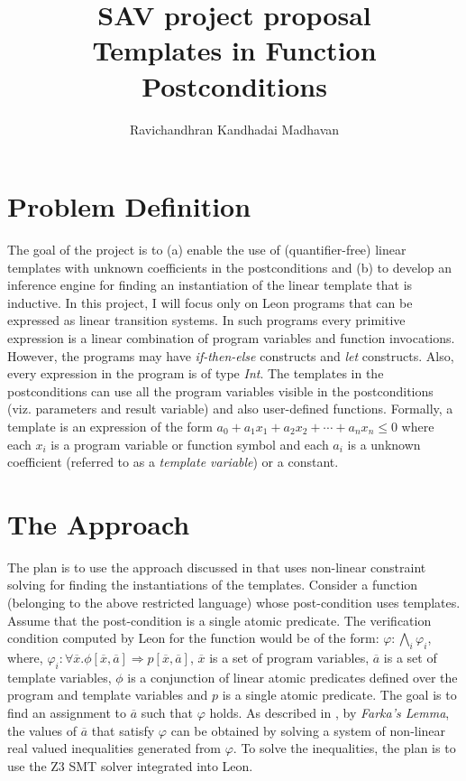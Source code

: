 \documentclass[a4paper,10pt]{article}
\begin{document}
\title{SAV project proposal \\ Templates in Function Postconditions}
\author{Ravichandhran Kandhadai Madhavan}
\maketitle

\newcommand{\dash}[1]{\overline{#1}}

\section{Problem Definition}

The goal of the project is to (a) enable the use of (quantifier-free) linear templates with unknown coefficients in the postconditions and (b) to develop an inference engine for finding an instantiation of the linear template that is inductive. In this project, I will focus only on Leon programs that can be expressed as linear transition systems. In such programs every primitive expression is a linear combination of program variables and function invocations. However, the programs may have \textit{if-then-else} constructs and \textit{let} constructs. Also, every expression in the program is of type \textit{Int}.
The templates in the postconditions can use all the program variables visible in the postconditions (viz. parameters and result variable) and also user-defined functions. Formally, a template is an expression of the form $a_0 + a_1x_1 + a_2x_2 + \cdots + a_nx_n \le 0$ where each $x_i$ is a program variable or function symbol and each $a_i$ is a unknown coefficient (referred to as a \textit{template variable}) or a constant.

\section{The Approach}

The plan is to use the approach discussed in \cite{ssriram:CAV03,ssriram:SAS04} that uses non-linear constraint solving for finding the instantiations of the templates. Consider a function (belonging to the above restricted language) whose post-condition uses templates. Assume that the post-condition is a single atomic predicate. The verification condition computed by Leon for the function would be of the form: $\varphi: \bigwedge_i \varphi_i$, where,
$\mathit{\varphi_i: } \forall \dash{x}. \phi[\dash{x},\dash{a}] \Rightarrow p[\dash{x},\dash{a}]$, $\dash{x}$ is a set of program variables, $\dash{a}$ is a set of template variables, $\phi$ is a conjunction of linear atomic predicates defined over the program and template variables and $p$ is a single atomic predicate.
The goal is to find an assignment to $\dash{a}$ such that $\varphi$ holds.
As described in \cite{ssriram:CAV03}, by \textit{Farka's Lemma}, the values of $\dash{a}$ that satisfy $\varphi$ can be obtained by solving a system of non-linear real valued inequalities generated from $\varphi$. To solve the inequalities, the plan is to use the Z3 SMT solver integrated into Leon.
\end{document}
